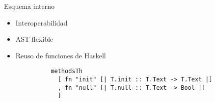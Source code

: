 \begin{frame}
  \framebreak{}
  \begin{center}
    Esquema interno
    \begin{itemize}
      \item Interoperabilidad

      \item AST flexible
      \item Reuso de funciones de Haskell
        \begin{verbatim}
          methodsTh
            [ fn "init" [| T.init :: T.Text -> T.Text |]
            , fn "null" [| T.null :: T.Text -> Bool |]
            ]
        \end{verbatim}
    \end{itemize}
  \end{center}
\end{frame}


